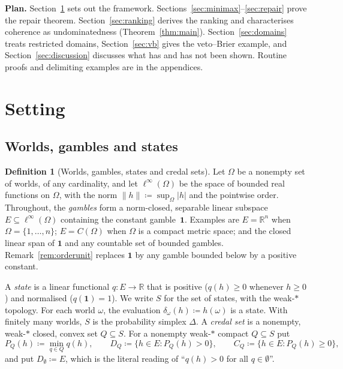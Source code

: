 \documentclass[11pt]{article}
\newcommand{\R}{\mathbb{R}}
\newcommand{\one}{\mathbf{1}}
\theoremstyle{plain}
\theoremstyle{definition}
\newtheorem{definition}[theorem]{Definition}
\theoremstyle{remark}
\begin{document}
\smallskip\noindent\textbf{Plan.} Section~\ref{sec:setting} sets out the framework.
Sections~\ref{sec:minimax}--\ref{sec:repair} prove the repair theorem.
Section~\ref{sec:ranking} derives the ranking and characterises coherence as undominatedness
(Theorem~\ref{thm:main}). Section~\ref{sec:domains}
treats restricted domains, Section~\ref{sec:vb} gives the veto--Brier example, and
Section~\ref{sec:discussion} discusses what has and has not been shown. Routine proofs and
delimiting examples are in the appendices.

\section{Setting}\label{sec:setting}

\subsection{Worlds, gambles and states}

\begin{definition}[Worlds, gambles, states and credal sets]\label{def:states}
Let $\Omega$ be a nonempty set of worlds, of any cardinality, and let $\ell^\infty(\Omega)$
be the space of bounded real functions on $\Omega$, with the norm $\|h\|\coloneqq
\sup_\Omega|h|$ and the pointwise order. Throughout, the \emph{gambles} form a norm-closed,
separable linear subspace $E\subseteq\ell^\infty(\Omega)$ containing the constant
gamble~$\one$. Examples are $E=\R^n$ when $\Omega=\{1,\dots,n\}$; $E=C(\Omega)$ when $\Omega$
is a compact metric space; and the closed linear span of $\one$ and any countable set of
bounded gambles. Remark~\ref{rem:orderunit} replaces $\one$ by any gamble bounded below by a
positive constant.

A \emph{state} is a linear functional $q:E\to\R$ that is positive ($q(h)\ge0$ whenever
$h\ge0$) and normalised ($q(\one)=1$). We write $S$ for the set of states, with the
weak-$\ast$ topology. For each world $\omega$, the evaluation $\delta_\omega(h)\coloneqq
h(\omega)$ is a state. With finitely many worlds, $S$ is the probability simplex $\Delta$.
A \emph{credal set} is a nonempty, weak-$\ast$ closed, convex set $Q\subseteq S$. For a
nonempty weak-$\ast$ compact $Q\subseteq S$ put
\[
  P_Q(h)\coloneqq\min_{q\in Q}q(h),\qquad D_Q\coloneqq\{h\in E:P_Q(h)>0\},\qquad
  C_Q\coloneqq\{h\in E:P_Q(h)\ge0\},
\]
and put $D_\emptyset\coloneqq E$, which is the literal reading of ``$q(h)>0$ for all $q\in
\emptyset$''.
\end{definition}
\end{document}
